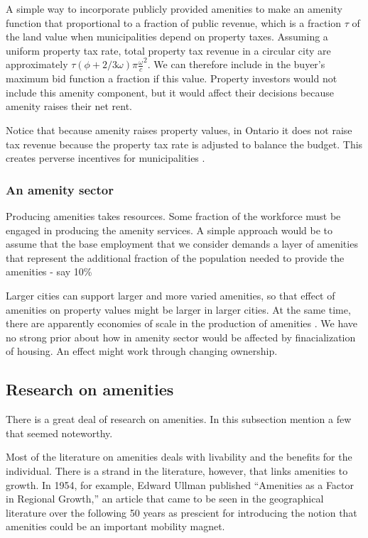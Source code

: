 A simple way to incorporate publicly provided amenities to make an amenity function that proportional to a fraction of public revenue, which is a fraction $\tau$ of the land value when municipalities depend on property taxes. Assuming a uniform property tax rate, total property tax revenue in a circular city are approximately $\tau(\phi+2/3 \omega)\pi \frac{\omega}{c}^2$. We can therefore include in the buyer's maximum bid function a fraction if this value. Property investors would not include this amenity component, but it would affect their decisions because amenity raises their net rent.

Notice that because amenity raises property values, in Ontario it does not raise tax revenue because the property tax rate is adjusted to balance the budget. This creates perverse incentives for municipalities \cite{blaisPerverseCitiesHidden2011}.


\subsubsection{An amenity sector}
Producing amenities takes resources. Some fraction of the workforce must be engaged in producing the amenity services. A simple approach would be to assume that the base employment that we consider demands a layer of amenities that represent the additional fraction of the population needed to provide the amenities - say 10\%  

Larger cities can support larger and more varied amenities, so that effect of amenities on property values might be larger in larger cities. At the same time, there are apparently economies of scale in the production of amenities \cite{kaufmannScalingUrbanAmenities2022}. We have no strong prior about how in amenity sector would be affected by finacialization of housing.  An effect might work through changing ownership.


\subsection{Research on amenities}
There is a great deal of research on amenities. In this subsection mention a few that seemed noteworthy. 

Most of the literature on amenities deals with livability and the benefits for the individual. There is a strand in the literature, however, that links amenities to growth. In 1954, for example, Edward Ullman \cite{ullmanAmenitiesFactorRegional1954} published  ``Amenities as a Factor in Regional Growth,'' an article that came to be seen in the geographical literature over the following 50 years as prescient \cite{walcottCommentsEdwardUllman2010} for introducing the notion that amenities could be an important mobility magnet. 


